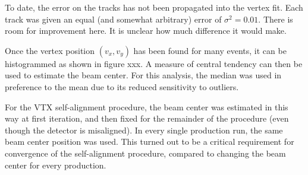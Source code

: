 \documentclass[12pt]{article}
\begin{document}
To date, the error on the tracks has not been propagated into the vertex fit. Each track was given an equal (and somewhat arbitrary) error of $\sigma^2 = 0.01$. There is room for improvement here. It is unclear how much difference it would make.

Once the vertex position $(v_x, v_y)$ has been found for many events, it can be histogrammed as shown in figure xxx. A measure of central tendency can then be used to estimate the beam center. For this analysis, the median was used in preference to the mean due to its reduced sensitivity to outliers.

For the VTX self-alignment procedure, the beam center was estimated in this way at first iteration, and then fixed for the remainder of the procedure (even though the detector is misaligned). In every single production run, the same beam center position was used. This turned out to be a critical requirement for convergence of the self-alignment procedure, compared to changing the beam center for every production. 
\end{document}
